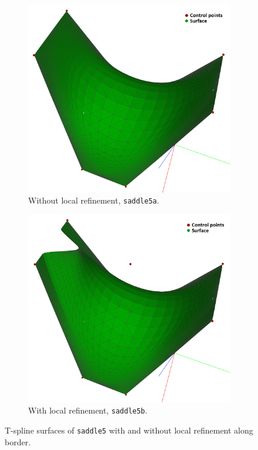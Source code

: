 \documentclass{article}
\begin{document}
\begin{figure}[H]
\centering
\begin{subfigure}[b]{0.48\textwidth}
\includegraphics[width=\textwidth]{saddle5a}
\caption{Without local refinement, \texttt{saddle5a}.}
\label{saddle5a}
\end{subfigure}
\begin{subfigure}[b]{0.48\textwidth}
\includegraphics[width=\textwidth]{saddle5b}
\caption{With local refinement, \texttt{saddle5b}.}
\label{saddle5b}
\end{subfigure}
\caption{T-spline surfaces of \texttt{saddle5} with and without local refinement along border.}
\label{saddle5}
\end{figure}
\end{document}
